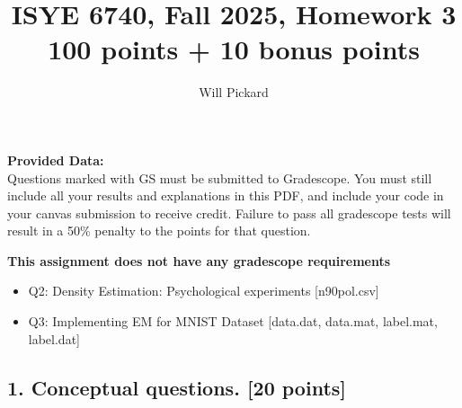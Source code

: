 \documentclass[twoside,12pt]{article}
\begin{document}
\title{ISYE 6740, Fall 2025, Homework 3\\{\small 100 points + 10 bonus points}\\}
\author{Will Pickard}
\date{}
\maketitle

\textbf{Provided Data:} \\
Questions marked with GS must be submitted to Gradescope. You must still include all your results and explanations in this PDF, and include your code in your canvas submission to receive credit. Failure to pass all gradescope tests will result in a 50\% penalty to the points for that question.

\textbf{This assignment does not have any gradescope requirements}

\begin{itemize}
    \item Q2: Density Estimation: Psychological experiments [n90pol.csv]
    \item Q3: Implementing EM for MNIST Dataset [data.dat, data.mat, label.mat, label.dat]
\end{itemize}

\subsection*{1. Conceptual questions. [20 points]}
\end{document}
